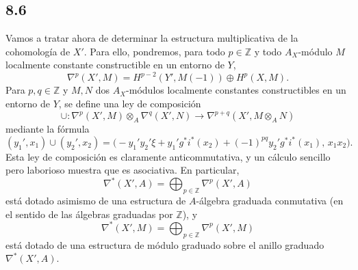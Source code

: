 \subsection*{8.6}

Vamos a tratar ahora de determinar la estructura multiplicativa de la cohomología de $X'$. Para ello, pondremos, para todo $p\in\mathbb Z$ y todo $A_X$-módulo $M$ localmente constante constructible en un entorno de $Y$,
\[
\nabla^p(X',M)=H^{p-2}(Y',M(-1))\oplus H^p(X,M).
\]
Para $p,q\in\mathbb Z$ y $M,N$ dos $A_X$-módulos localmente constantes constructibles en un entorno de $Y$, se define una ley de composición
\[
\cup:\nabla^p(X',M)\otimes_A\nabla^q(X',N)\to
\nabla^{p+q}(X',M\otimes_A N)
\tag{8.6.1}
\]
mediante la fórmula
\[
(y_1',x_1)\cup(y_2',x_2)=
\bigl(-y_1'y_2'\xi+y_1'g^*i^*(x_2)+(-1)^{pq}y_2'g^*i^*(x_1),\,x_1x_2\bigr).
\tag{8.6.2}
\]
Esta ley de composición es claramente anticommutativa, y un cálculo sencillo pero laborioso muestra que es asociativa. En particular,
\[
\nabla^*(X',A)=\bigoplus_{p\in\mathbb Z}\nabla^p(X',A)
\]
está dotado asimismo de una estructura de $A$-álgebra graduada conmutativa (en el sentido de las álgebras graduadas por $\mathbb Z$), y
\[
\nabla^*(X',M)=\bigoplus_{p\in\mathbb Z}\nabla^p(X',M)
\]
está dotado de una estructura de módulo graduado sobre el anillo graduado $\nabla^*(X',A)$.
